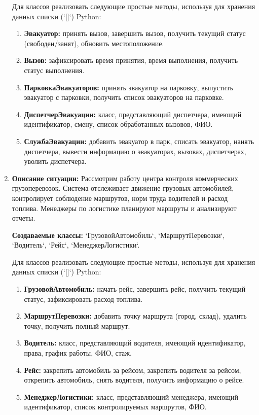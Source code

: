 \begin{enumerate}
Для классов реализовать следующие простые методы, используя для хранения данных списки (`[]`) Python:
\begin{enumerate}
    \item \textbf{Эвакуатор:} принять вызов, завершить вызов, 
    получить текущий статус (свободен/занят), обновить местоположение.
    \item \textbf{Вызов:} зафиксировать время принятия, время выполнения, 
    получить статус выполнения.
    \item \textbf{ПарковкаЭвакуаторов:} принять эвакуатор на парковку, 
    выпустить эвакуатор с парковки, 
    получить список эвакуаторов на парковке.
    \item \textbf{ДиспетчерЭвакуации:} класс, представляющий диспетчера, 
    имеющий идентификатор, смену, список обработанных вызовов, ФИО.
    \item \textbf{СлужбаЭвакуации:} добавить эвакуатор в парк, 
    списать эвакуатор, 
    нанять диспетчера, вывести информацию о эвакуаторах, вызовах, диспетчерах, уволить диспетчера.
\end{enumerate}

\item \textbf{Описание ситуации:} Рассмотрим работу центра контроля коммерческих грузоперевозок. 
Система отслеживает движение грузовых автомобилей, контролирует соблюдение маршрутов, 
норм труда водителей и расход топлива. Менеджеры по логистике планируют маршруты 
и анализируют отчеты.

\textbf{Создаваемые классы:} `ГрузовойАвтомобиль`, `МаршрутПеревозки`, `Водитель`, `Рейс`, `МенеджерЛогистики`.

Для классов реализовать следующие простые методы, используя для хранения данных списки (`[]`) Python:
\begin{enumerate}
    \item \textbf{ГрузовойАвтомобиль:} начать рейс, завершить рейс, получить текущий статус, 
    зафиксировать расход топлива.
    \item \textbf{МаршрутПеревозки:} добавить точку маршрута (город, склад), 
    удалить точку, получить полный маршрут.
    \item \textbf{Водитель:} класс, представляющий водителя, 
    имеющий идентификатор, права, график работы, ФИО, стаж.
    \item \textbf{Рейс:} закрепить автомобиль за рейсом, закрепить водителя за рейсом, 
    открепить автомобиль, снять водителя, получить информацию о рейсе.
    \item \textbf{МенеджерЛогистики:} класс, представляющий менеджера, 
    имеющий идентификатор, список контролируемых маршрутов, ФИО.
\end{enumerate}


\end{enumerate}
